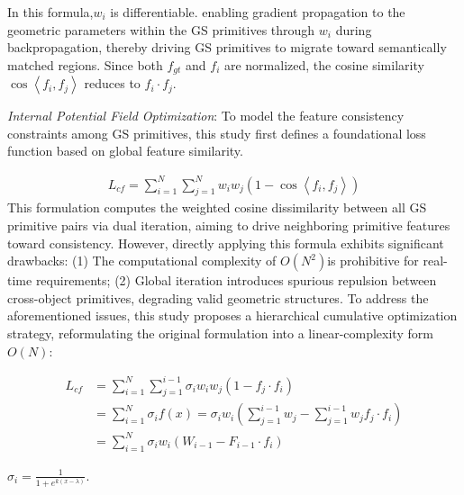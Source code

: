 \documentclass[numbers]{article}
\begin{document}
In this formula,\( w_i\) is differentiable.  enabling gradient propagation to the geometric parameters within the GS primitives through \(w_i\) during backpropagation, thereby driving GS primitives to migrate toward semantically matched regions. Since both \(f_{gt}\) and \(f_i\) are normalized, the cosine similarity \(\cos\left\langle f_i, f_j \right\rangle\) reduces to \(f_i \cdot f_j\).

\emph{Internal Potential Field Optimization}: To model the feature consistency constraints among GS primitives, this study first defines a foundational loss function based on global feature similarity.

\begin{align*}
    L_{cf} = \sum_{i=1}^{N}\sum_{j=1}^{N} w_i w_j\left(1 - \cos\left\langle f_i, f_j \right\rangle\right)
\end{align*}
This formulation computes the weighted cosine dissimilarity between all GS primitive pairs via dual iteration, aiming to drive neighboring primitive features toward consistency. However, directly applying this formula exhibits significant drawbacks: (1) The computational complexity of
\(O(N^2)\)is prohibitive for real-time requirements; (2) Global iteration introduces spurious repulsion between cross-object primitives, degrading valid geometric structures.
To address the aforementioned issues, this study proposes a hierarchical cumulative optimization strategy, reformulating the original formulation into a linear-complexity form \(O(N)\):

\begin{equation}
\begin{split}
    L_{cf} 
    &= \sum_{i=1}^{N}\sum_{j=1}^{i-1}\sigma_i w_i w_j\left(1 - f_j \cdot f_i\right) \\
    &= \sum_{i=1}^{N}\sigma_if(x)=\sigma_i w_i\left(\sum_{j=1}^{i-1}w_j - \sum_{j=1}^{i-1}w_j f_j \cdot f_i\right) \\
    &= \sum_{i=1}^{N}\sigma_i w_i\left(W_{i-1} - F_{i-1} \cdot f_i\right)
\end{split}
\end{equation}

\(\sigma_i = \frac{1}{1+e^{k(x-\lambda)}}\).
\end{document}
